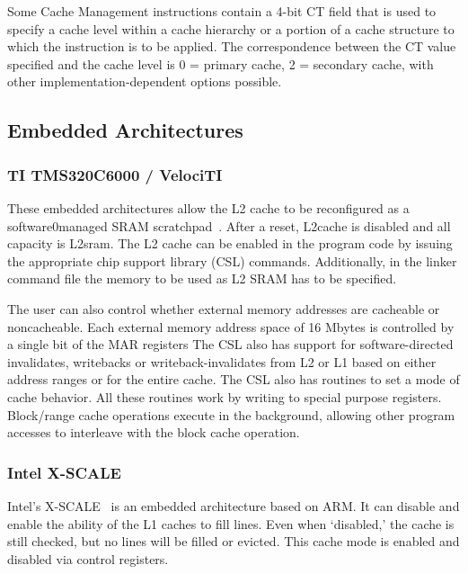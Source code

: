 Some Cache Management instructions contain a 4-bit CT field that is used to specify a cache level within a cache hierarchy or a portion of a cache structure to which the instruction is to be applied. The correspondence between the CT value specified and the cache level is 0 = primary cache, 2 = secondary cache, with other implementation-dependent  options possible.

\subsection{Embedded Architectures}
\subsubsection{TI TMS320C6000 / VelociTI}
These embedded architectures allow the L2 cache to be reconfigured as a software0managed SRAM scratchpad~\cite{TMS320C6000}.
After a reset, L2cache is disabled and all capacity is L2sram.
The L2 cache can be enabled in the program code by issuing the appropriate chip support library (CSL) commands.
Additionally, in the linker command file the memory to be used as L2 SRAM has to be specified.

The user can also control whether external memory addresses are cacheable or noncacheable.
Each external memory address space of 16 Mbytes is controlled by a single bit of the MAR registers
The CSL also has support for software-directed invalidates, writebacks or writeback-invalidates from L2 or L1
based on either address ranges or for the entire cache.
The CSL also has routines to set a mode of cache behavior.
All these routines work by writing to special purpose registers.
Block/range cache operations execute in the background, allowing other
program accesses to interleave with the block cache operation.

\subsubsection{Intel X-SCALE}

Intel's X-SCALE~\cite{intel-xscale} is an embedded architecture based on ARM.
It can disable and enable the ability of the L1 caches to fill lines.
Even when `disabled,' the cache is still checked, but no lines will be filled or evicted. 
This cache mode is enabled and disabled via control registers.

